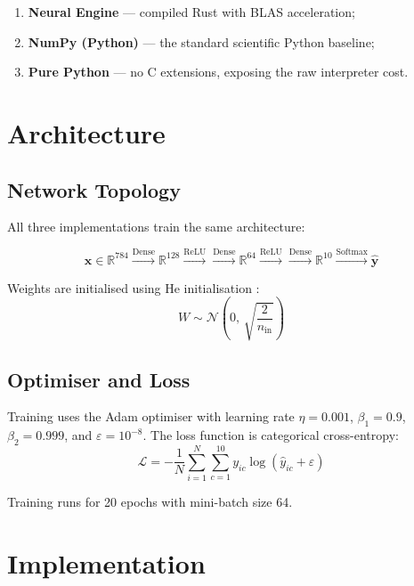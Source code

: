 \documentclass[11pt]{article}
\begin{document}
\begin{enumerate}[leftmargin=*, itemsep=2pt]
  \item \textbf{Neural Engine} --- compiled Rust with BLAS acceleration;
  \item \textbf{NumPy (Python)} --- the standard scientific Python baseline;
  \item \textbf{Pure Python} --- no C extensions, exposing the raw interpreter cost.
\end{enumerate}

\section{Architecture}

\subsection{Network Topology}

All three implementations train the same architecture:

\[
\mathbf{x} \in \mathbb{R}^{784}
\xrightarrow{\text{Dense}} \mathbb{R}^{128}
\xrightarrow{\text{ReLU}}
\xrightarrow{\text{Dense}} \mathbb{R}^{64}
\xrightarrow{\text{ReLU}}
\xrightarrow{\text{Dense}} \mathbb{R}^{10}
\xrightarrow{\text{Softmax}}
\hat{\mathbf{y}}
\]

Weights are initialised using He initialisation \cite{he2015}:
\[
W \sim \mathcal{N}\left(0,\, \sqrt{\frac{2}{n_{\text{in}}}}\right)
\]

\subsection{Optimiser and Loss}

Training uses the Adam optimiser \cite{kingma2014} with learning rate $\eta = 0.001$, $\beta_1 = 0.9$, $\beta_2 = 0.999$, and $\varepsilon = 10^{-8}$. The loss function is categorical cross-entropy:
\[
\mathcal{L} = -\frac{1}{N}\sum_{i=1}^{N}\sum_{c=1}^{10} y_{ic}\log(\hat{y}_{ic} + \varepsilon)
\]

Training runs for 20 epochs with mini-batch size 64.

\section{Implementation}
\end{document}
